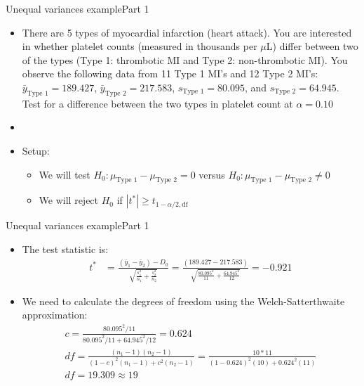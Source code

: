 \documentclass[xcolor=dvipsnames]{beamer}
\begin{document}
\begin{frame}{Unequal variances example}{Part 1}
	\begin{itemize}
		\item There are 5 types of myocardial infarction (heart attack). You are interested in whether platelet counts (measured in thousands per $\mu$L) differ between two of the types (Type 1: thrombotic MI and Type 2: non-thrombotic MI). You observe the following data from 11 Type 1 MI's and 12 Type 2 MI's: $\bar{y}_{\text{Type 1}}=189.427$, $\bar{y}_{\text{Type 2}}=217.583$, $s_{\text{Type 1}} = 80.095$, and $s_{\text{Type 2}} = 64.945$. Test for a difference between the two types in platelet count at $\alpha = 0.10$
		\item[]
		\item Setup:
		\begin{itemize}
			\item We will test $H_0: \mu_{\text{Type 1}} - \mu_{\text{Type 2}} =0$ versus $H_0: \mu_{\text{Type 1}} - \mu_{\text{Type 2}} \neq 0$
			\item We will reject $H_0$ if $|t^*| \geq t_{1-\alpha / 2, \text{df}}$
		\end{itemize}
	\end{itemize}
\end{frame}

\begin{frame}{Unequal variances example}{Part 1}
	\begin{itemize}
		\item The test statistic is: 
		\begin{align*}
		t^* &= \frac{(\bar{y}_1-\bar{y}_2)-D_0}{\sqrt{\frac{s^2_1}{n_1}+\frac{s^2_2}{n_2}}} = \frac{(189.427-217.583)}{\sqrt{\frac{80.095^2}{11}+\frac{64.945^2}{12}}} = -0.921
		\end{align*}
		\item We need to calculate the degrees of freedom using the Welch-Satterthwaite approximation:
		\begin{gather*}
			c = \frac{80.095^2 / 11}{80.095^2 / 11 + 64.945^2/12} = 0.624\\
			df = \frac{(n_1 -1)(n_2-1)}{(1-c)^2(n_1-1)+c^2(n_2-1)} = \frac{10*11}{(1-0.624)^2(10) + 0.624^2 (11)} \\
			df = 19.309 \approx 19
		\end{gather*}
	\end{itemize}
\end{frame}
\end{document}
